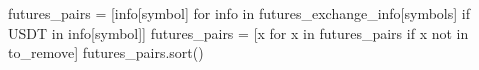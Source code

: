 \documentclass[
  letterpaper,
  DIV=11,
  numbers=noendperiod]{scrartcl}
\newenvironment{Shaded}{\begin{snugshade}}{\end{snugshade}}
\newcommand{\ControlFlowTok}[1]{\textcolor[rgb]{0.00,0.23,0.31}{#1}}
\newcommand{\KeywordTok}[1]{\textcolor[rgb]{0.00,0.23,0.31}{#1}}
\newcommand{\NormalTok}[1]{\textcolor[rgb]{0.00,0.23,0.31}{#1}}
\newcommand{\OperatorTok}[1]{\textcolor[rgb]{0.37,0.37,0.37}{#1}}
\newcommand{\StringTok}[1]{\textcolor[rgb]{0.13,0.47,0.30}{#1}}
\begin{document}
\begin{Shaded}
\begin{Highlighting}[]
\NormalTok{futures\_pairs }\OperatorTok{=}\NormalTok{ [info[}\StringTok{\textquotesingle{}symbol\textquotesingle{}}\NormalTok{] }\ControlFlowTok{for}\NormalTok{ info }\KeywordTok{in}\NormalTok{ futures\_exchange\_info[}\StringTok{\textquotesingle{}symbols\textquotesingle{}}\NormalTok{] }\ControlFlowTok{if} \StringTok{\textquotesingle{}USDT\textquotesingle{}} \KeywordTok{in}\NormalTok{ info[}\StringTok{\textquotesingle{}symbol\textquotesingle{}}\NormalTok{]]}
\NormalTok{futures\_pairs }\OperatorTok{=}\NormalTok{ [x }\ControlFlowTok{for}\NormalTok{ x }\KeywordTok{in}\NormalTok{ futures\_pairs }\ControlFlowTok{if}\NormalTok{ x }\KeywordTok{not} \KeywordTok{in}\NormalTok{ to\_remove]}
\NormalTok{futures\_pairs.sort()}
\end{Highlighting}
\end{Shaded}
\end{document}
